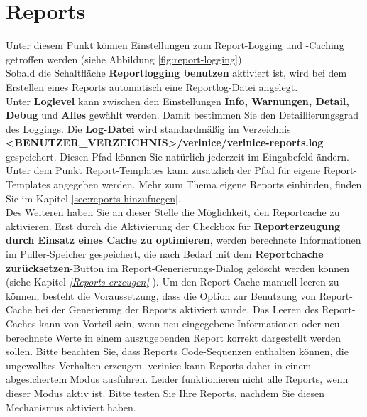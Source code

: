 \documentclass[a4paper,10pt]{book}
\begin{document}
\section{Reports} \label{Reports}
Unter diesem Punkt können Einstellungen zum Report-Logging und -Caching getroffen werden (siehe Abbildung \ref{fig:report-logging}).
\newline\\
Sobald die Schaltfläche \textbf{Reportlogging benutzen} aktiviert ist, wird bei dem Erstellen eines Reports automatisch eine Reportlog-Datei angelegt.
\newline\\
Unter \textbf{Loglevel} kann zwischen den Einstellungen \textbf{Info, Warnungen, Detail, Debug} und \textbf{Alles} gewählt werden.
Damit bestimmen Sie den Detaillierungsgrad des Loggings. Die \textbf{Log-Datei} wird standardmäßig im Verzeichnis
\textbf{\textless BENUTZER\_VERZEICHNIS\textgreater /verinice/verinice-reports.log} gespeichert. Diesen Pfad können Sie natürlich jederzeit im Eingabefeld ändern.\\

Unter dem Punkt Report-Templates kann zusätzlich der Pfad für eigene
Report-Templates angegeben werden. Mehr zum Thema eigene Reports
einbinden, finden Sie im Kapitel \ref{sec:reports-hinzufuegen}.\\

Des Weiteren haben Sie an dieser Stelle die Möglichkeit, den Reportcache zu aktivieren.
Erst durch die Aktivierung der Checkbox für \textbf{Reporterzeugung durch Einsatz eines Cache zu optimieren}, werden
berechnete Informationen im Puffer-Speicher gespeichert, die nach Bedarf mit dem \textbf{Reportchache zurücksetzen}-Button im
Report-Generierungs-Dialog gelöscht werden können (siehe Kapitel {\em \ref{Reports erzeugen} }).
Um den Report-Cache manuell leeren zu können, besteht die Voraussetzung, dass die Option zur Benutzung von Report-Cache bei der
Generierung der Reports aktiviert wurde.
\newline
Das Leeren des Report-Caches kann von Vorteil sein, wenn neu eingegebene Informationen oder neu berechnete
Werte in einem auszugebenden Report korrekt dargestellt werden sollen.
\newline
\newline
Bitte beachten Sie, dass Reports Code-Sequenzen enthalten können, die ungewolltes Verhalten erzeugen. verinice kann Reports daher in einem abgesichertem Modus ausführen. Leider funktionieren nicht alle Reports, wenn dieser Modus aktiv ist. Bitte testen Sie Ihre Reports, 
nachdem Sie diesen Mechanismus aktiviert haben.
\end{document}
